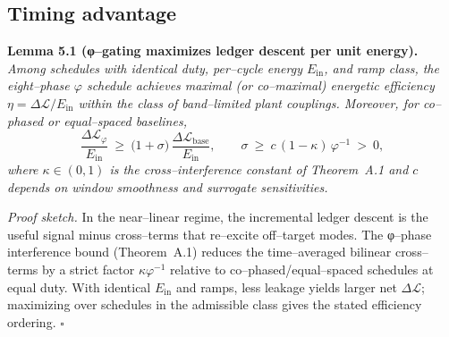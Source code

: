 \documentclass[11pt]{article}
\begin{document}
\subsection{Timing advantage}
\textbf{Lemma 5.1 (φ--gating maximizes ledger descent per unit energy).}
\emph{Among schedules with identical duty, per--cycle energy $E_{\mathrm{in}}$, and ramp class, the eight--phase $\varphi$ schedule achieves maximal (or co--maximal) energetic efficiency $\eta=\Delta\mathcal{L}/E_{\mathrm{in}}$ within the class of band--limited plant couplings. Moreover, for co--phased or equal--spaced baselines,}
\[
\frac{\Delta\mathcal{L}_\varphi}{E_{\mathrm{in}}}\ \ge\ \Big(1+\sigma\Big)\,\frac{\Delta\mathcal{L}_{\mathrm{base}}}{E_{\mathrm{in}}},\qquad
\sigma\ \ge\ c\,(1-\kappa)\,\varphi^{-1}\ >\ 0,
\]
\emph{where $\kappa\in(0,1)$ is the cross--interference constant of Theorem~A.1 and $c$ depends on window smoothness and surrogate sensitivities.}

\emph{Proof sketch.} In the near--linear regime, the incremental ledger descent is the useful signal minus cross--terms that re--excite off--target modes. The φ--phase interference bound (Theorem~A.1) reduces the time--averaged bilinear cross--terms by a strict factor $\kappa\varphi^{-1}$ relative to co--phased/equal--spaced schedules at equal duty. With identical $E_{\mathrm{in}}$ and ramps, less leakage yields larger net $\Delta\mathcal{L}$; maximizing over schedules in the admissible class gives the stated efficiency ordering. \hfill$\square$
\end{document}
